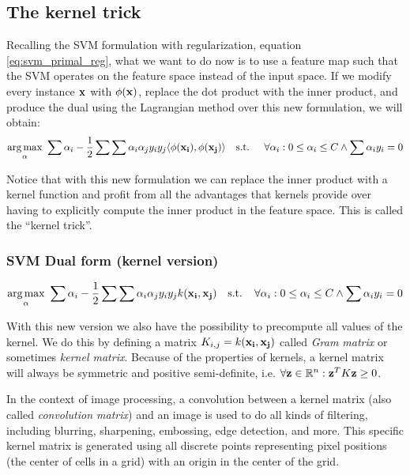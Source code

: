 \subsection{The kernel trick}

Recalling the SVM formulation with regularization, equation \ref{eq:svm_primal_reg}, what we want to do now is to use a feature map such that the SVM operates on the feature space instead of the input space. If we modify every instance $\mathbf{x}$ with $\phi(\mathbf{x})$, replace the dot product with the inner product, and produce the dual using the Lagrangian method over this new formulation, we will obtain:
\begin{align*}
    \underset{\mathbf{\alpha}}{\text{arg} \max}\ \sum \alpha_i - \frac{1}{2} \sum \sum \alpha_i \alpha_j y_i y_j \langle\phi(\mathbf{x_i}), \phi(\mathbf{x_j})\rangle
    \text{\quad s.t. \quad} \forall \alpha_i : 0 \le \alpha_i \le C \land \sum \alpha_i y_i = 0
\end{align*}

Notice that with this new formulation we can replace the inner product with a kernel function and profit from all the advantages that kernels provide over having to explicitly compute the inner product in the feature space. This is called the “kernel trick”.

\subsubsection*{SVM Dual form (kernel version)}
\begin{align}\label{eq:svm_dual_kernel} 
    \underset{\mathbf{\alpha}}{\text{arg} \max}\ \sum \alpha_i - \frac{1}{2} \sum \sum \alpha_i \alpha_j y_i y_j k(\mathbf{x_i}, \mathbf{x_j})
    \text{\ \ \ s.t. \ \ } \forall \alpha_i : 0 \le \alpha_i \le C \land \sum \alpha_i y_i = 0
\end{align}

With this new version we also have the possibility to precompute all values of the kernel. We do this by defining a matrix $K_{i,j} = k(\mathbf{x_i}, \mathbf{x_j})$ called \emph{Gram matrix} or sometimes \emph{kernel matrix}. Because of the properties of kernels, a kernel matrix will always be symmetric and positive semi-definite, i.e. $\forall \mathbf{z} \in \mathbb{R}^n : \mathbf{z}^T K \mathbf{z} \ge 0$.

In the context of image processing, a convolution between a kernel matrix (also called \emph{convolution matrix}) and an image is used to do all kinds of filtering, including blurring, sharpening, embossing, edge detection, and more. This specific kernel matrix is generated using all discrete points representing pixel positions (the center of cells in a grid) with an origin in the center of the grid.

